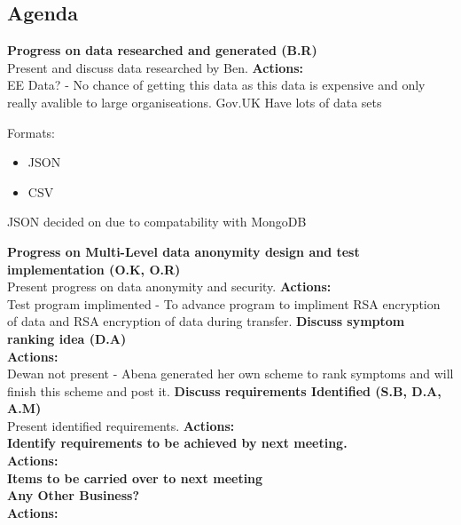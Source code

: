 \documentclass[a4wide,10pt]{extarticle}
\begin{document}
{\begin{center}
\begin{itemize}
    \end{itemize}
\end{center}


\subsection*{Agenda}
{\large \textbf{Progress on data researched and generated (B.R)\\}}
Present and discuss data researched by Ben.
\textbf{Actions:\\}
EE Data? - No chance of getting this data as this data is expensive and only really avalible to large organiseations.
Gov.UK Have lots of data sets

Formats:
\begin{itemize}
    \item JSON
    \item CSV
\end{itemize}


JSON decided on due to compatability with MongoDB

\hfill \break
\hfill \break
{\large \textbf{Progress on Multi-Level data anonymity design and test implementation (O.K, O.R)\\}}
Present progress on data anonymity and security.
\textbf{Actions:\\}
Test program implimented - To advance program to impliment RSA encryption of data and RSA encryption of data during transfer.
\hfill \break
\hfill \break
{\large \textbf{Discuss symptom ranking idea (D.A)\\}}
\textbf{Actions:\\}
Dewan not present - Abena generated her own scheme to rank symptoms and will finish this scheme and post it.
\hfill \break
\hfill \break
{\large \textbf{Discuss requirements Identified (S.B, D.A, A.M)\\}}
Present identified requirements.
\textbf{Actions:\\}
\hfill \break
\hfill \break
\hfill \break
\hfill \break
{\large \textbf{Identify requirements to be achieved by next meeting.\\}}
\textbf{Actions:\\}
\hfill \break
\hfill \break
\hfill \break
\hfill \break
{\large \textbf{Items to be carried over to next meeting\\}}
\hfill \break
\hfill \break
\hfill \break
\hfill \break
\hfill \break
{\large \textbf{Any Other Business?\\}}
\textbf{Actions:\\}
\hfill \break
\hfill \break
\hfill \break
\hfill \break
\hfill \break

}
\end{document}
